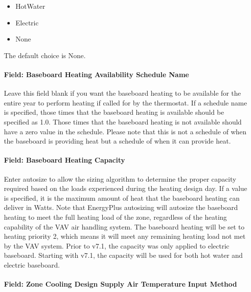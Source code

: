 \begin{itemize}
\item
  HotWater
\item
  Electric
\item
  None
\end{itemize}

The default choice is None.

\paragraph{Field: Baseboard Heating Availability Schedule Name}\label{field-baseboard-heating-availability-schedule-name-11}

Leave this field blank if you want the baseboard heating to be available for the entire year to perform heating if called for by the thermostat. If a schedule name is specified, those times that the baseboard heating is available should be specified as 1.0. Those times that the baseboard heating is not available should have a zero value in the schedule. Please note that this is not a schedule of when the baseboard is providing heat but a schedule of when it can provide heat.

\paragraph{Field: Baseboard Heating Capacity}\label{field-baseboard-heating-capacity-11}

Enter autosize to allow the sizing algorithm to determine the proper capacity required based on the loads experienced during the heating design day. If a value is specified, it is the maximum amount of heat that the baseboard heating can deliver in Watts. Note that EnergyPlus autosizing will autosize the baseboard heating to meet the full heating load of the zone, regardless of the heating capability of the VAV air handling system. The baseboard heating will be set to heating priority 2, which means it will meet any remaining heating load not met by the VAV system. Prior to v7.1, the capacity was only applied to electric baseboard. Starting with v7.1, the capacity will be used for both hot water and electric baseboard.

\paragraph{Field: Zone Cooling Design Supply Air Temperature Input Method}\label{field-zone-cooling-design-supply-air-temperature-input-method-10}

